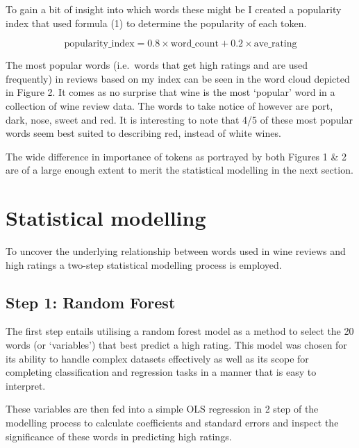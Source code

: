 \documentclass[11pt,preprint]{elsarticle}
\numberwithin{equation}{section}
\numberwithin{figure}{section}
\numberwithin{table}{section}
\begin{document}
To gain a bit of insight into which words these might be I created a
popularity index that used formula (1) to determine the popularity of
each token.

\begin{equation}
    \text{popularity\_index} = 0.8 \times \text{word\_count} + 0.2 \times \text{ave\_rating}
\end{equation}

The most popular words (i.e.~words that get high ratings and are used
frequently) in reviews based on my index can be seen in the word cloud
depicted in Figure 2. It comes as no surprise that wine is the most
`popular' word in a collection of wine review data. The words to take
notice of however are port, dark, nose, sweet and red. It is interesting
to note that 4/5 of these most popular words seem best suited to
describing red, instead of white wines.

The wide difference in importance of tokens as portrayed by both Figures
1 \& 2 are of a large enough extent to merit the statistical modelling
in the next section.

\newpage

\section{\texorpdfstring{Statistical modelling
\label{StatMod}}{Statistical modelling }}\label{statistical-modelling}

To uncover the underlying relationship between words used in wine
reviews and high ratings a two-step statistical modelling process is
employed.

\subsection{Step 1: Random Forest}\label{step-1-random-forest}

The first step entails utilising a random forest model as a method to
select the 20 words (or `variables') that best predict a high rating.
This model was chosen for its ability to handle complex datasets
effectively as well as its scope for completing classification and
regression tasks in a manner that is easy to interpret.

These variables are then fed into a simple OLS regression in 2 step of
the modelling process to calculate coefficients and standard errors and
inspect the significance of these words in predicting high ratings.
\end{document}
